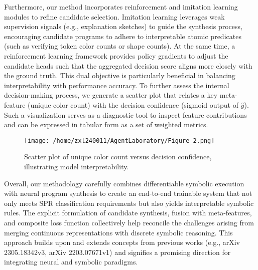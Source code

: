 \documentclass[11pt]{article}
\begin{document}
Furthermore, our method incorporates reinforcement and imitation learning modules to refine candidate selection. Imitation learning leverages weak supervision signals (e.g., explanation sketches) to guide the synthesis process, encouraging candidate programs to adhere to interpretable atomic predicates (such as verifying token color counts or shape counts). At the same time, a reinforcement learning framework provides policy gradients to adjust the candidate heads such that the aggregated decision score aligns more closely with the ground truth. This dual objective is particularly beneficial in balancing interpretability with performance accuracy. To further assess the internal decision-making process, we generate a scatter plot that relates a key meta-feature (unique color count) with the decision confidence (sigmoid output of \(\hat{y}\)). Such a visualization serves as a diagnostic tool to inspect feature contributions and can be expressed in tabular form as a set of weighted metrics.

\begin{figure}[h]
\caption{Scatter plot of unique color count versus decision confidence, illustrating model interpretability.}
\centering
\texttt{[image: /home/zxl240011/AgentLaboratory/Figure\_2.png]}
\label{fig:fig2}
\end{figure}

Overall, our methodology carefully combines differentiable symbolic execution with neural program synthesis to create an end-to-end trainable system that not only meets SPR classification requirements but also yields interpretable symbolic rules. The explicit formulation of candidate synthesis, fusion with meta-features, and composite loss function collectively help reconcile the challenges arising from merging continuous representations with discrete symbolic reasoning. This approach builds upon and extends concepts from previous works (e.g., arXiv 2305.18342v3, arXiv 2203.07671v1) and signifies a promising direction for integrating neural and symbolic paradigms.
\end{document}
